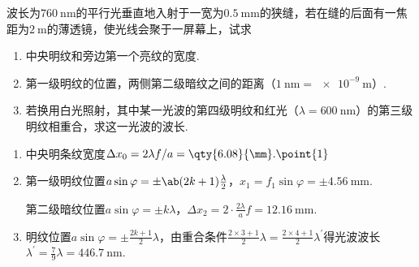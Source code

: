 \begin{problem}[弗琅禾费衍射][8]
    波长为$\qty{760}{\nm}$的平行光垂直地入射于一宽为$\qty{0.5}{\mm}$的狭缝，若在缝的后面有一焦距为$\qty{2}{\m}$的薄透镜，使光线会聚于一屏幕上，试求
\begin{enumerate}
    \item 中央明纹和旁边第一个亮纹的宽度.
    \item 第一级明纹的位置，两侧第二级暗纹之间的距离（$\qty{1}{\nm}=\qty{e-9}{\m}$）.
    \item 若换用白光照射，其中某一光波的第四级明纹和红光（$\lambda=\qty{600}{\nm}$）的第三级明纹相重合，求这一光波的波长.
\end{enumerate}
\end{problem}
\begin{solution}
    \begin{enumerate}
        \item 中央明条纹宽度$\Delta x_0=2\lambda f/a=\qty{6.08}{\mm}.\point{1}$
        \item 第一级明纹位置$a\sin{\varphi}=\pm\ab(2k+1)\frac{\lambda}{2}$，$x_1=f_1\sin{\varphi}=\pm\qty{4.56}{\mm}$.
        
        第二级暗纹位置$a\sin{\varphi}=\pm k\lambda$，$\Delta x_2=2\cdot\frac{2\lambda}{a}f=\qty{12.16}{\mm}$.
        \item 明纹位置$a\sin{\varphi}=\pm\frac{2k+1}{2}\lambda$，由重合条件$\frac{2\times 3+1}{2}\lambda=\frac{2\times 4+1}{2}\lambda^{\prime}$得光波波长$\lambda^{\prime}=\frac{7}{9}\lambda=\qty{446.7}{\nm}$.
    \end{enumerate}
\end{solution}


